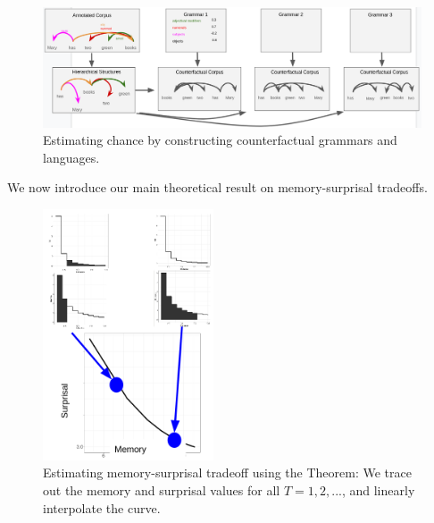 




\begin{figure}
\centering
\includegraphics[width=\textwidth]{figures-gdrive/counterfactual-languages.png}
	\caption{ Estimating chance by constructing counterfactual grammars and languages.}\label{fig:grammars}
\end{figure}










We now introduce our main theoretical result on memory-surprisal tradeoffs.





\begin{figure}
	\begin{center}
\includegraphics[width=0.45\textwidth]{figures/interpolate-curve.png}
\end{center}
	\caption{Estimating memory-surprisal tradeoff using the Theorem: We trace out the memory and surprisal values for all $T=1, 2, ...$, and linearly interpolate the curve.}\label{fig:interpolate}
\end{figure}







